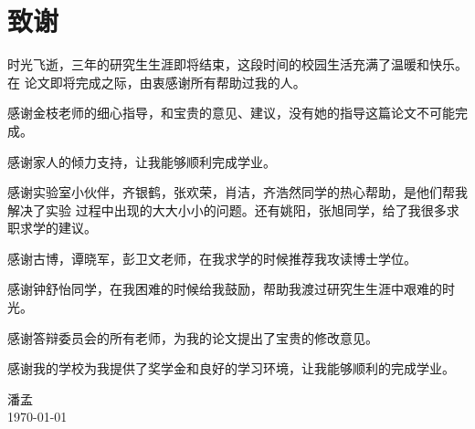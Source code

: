 \chapter{致谢}

时光飞逝，三年的研究生生涯即将结束，这段时间的校园生活充满了温暖和快乐。在
论文即将完成之际，由衷感谢所有帮助过我的人。

感谢金枝老师的细心指导，和宝贵的意见、建议，没有她的指导这篇论文不可能完成。

感谢家人的倾力支持，让我能够顺利完成学业。

感谢实验室小伙伴，齐银鹤，张欢荣，肖洁，齐浩然同学的热心帮助，是他们帮我解决了实验
过程中出现的大大小小的问题。还有姚阳，张旭同学，给了我很多求职求学的建议。

感谢古博，谭晓军，彭卫文老师，在我求学的时候推荐我攻读博士学位。

感谢钟舒怡同学，在我困难的时候给我鼓励，帮助我渡过研究生生涯中艰难的时光。

感谢答辩委员会的所有老师，为我的论文提出了宝贵的修改意见。

感谢我的学校为我提供了奖学金和良好的学习环境，让我能够顺利的完成学业。
\vskip 108pt
\begin{flushright}
	潘孟\makebox[1cm]{} \\
	\today
\end{flushright}


